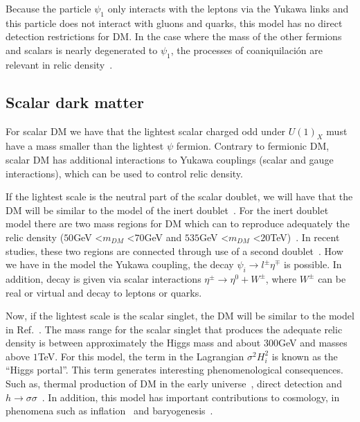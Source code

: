 \documentclass[12pt]{article}
\begin{document}
Because the particle $\psi_{1}$ only interacts with the leptons via the Yukawa links and this particle does not interact with gluons and quarks, this model has no direct detection restrictions for DM. In the case where the mass of the other fermions and scalars is nearly degenerated to $\psi_{1} $, the processes of coaniquilación are relevant in relic density~\cite{Klasen:2013jpa}.

\subsection{Scalar dark matter}
For scalar DM we have that the lightest scalar charged odd under $U(1)_X$ must have a mass smaller than the lightest $\psi$ fermion. Contrary to fermionic DM, scalar DM has additional interactions to Yukawa couplings (scalar and gauge interactions), which can be used to control relic density.

If the lightest scale is the neutral part of the scalar doublet, we will have that the DM will be similar to the model of the inert doublet~\cite{Honorez:2010re}. For the inert doublet model there are two mass regions for DM which can to reproduce adequately the relic density ($50$GeV \textless $m_{DM}$ \textless $70$GeV and $535$GeV \textless $m_{DM}$ \textless $20$TeV)~\cite{Garcia-Cely:2015khw}. In recent studies, these two regions are connected through use of a second doublet~\cite{Borah:2019aeq}. How we have in the model the Yukawa coupling, the decay $\psi_{i} \to l^{\pm} \eta^{\mp}$ is possible. In addition, decay is given via scalar interactions $\eta^{\pm} \to \eta^{0} + {W^{\pm}}$, where $W^{\pm}$ can be real or virtual and decay to leptons or quarks.

Now, if the lightest scale is the scalar singlet, the DM will be similar to the model in Ref.~\cite{Athron:2017kgt}. The mass range for the scalar singlet that produces the adequate relic density is between approximately the Higgs mass and about $300$GeV and masses above $1$TeV. For this model, the term in the Lagrangian $\sigma^{2} H^{2}_{i}$ is known as the \textquotedblleft Higgs portal\textquotedblright. This term generates interesting phenomenological consequences. Such as, thermal production of DM in the early universe~\cite{Yaguna:2008hd}, direct detection and $h \to \sigma \sigma$~\cite{Mambrini:2011ik}. In addition, this model has important contributions to cosmology, in phenomena such as inflation~\cite{Lerner:2009xg} and baryogenesis~\cite{Cline:2012hg}.
\end{document}
